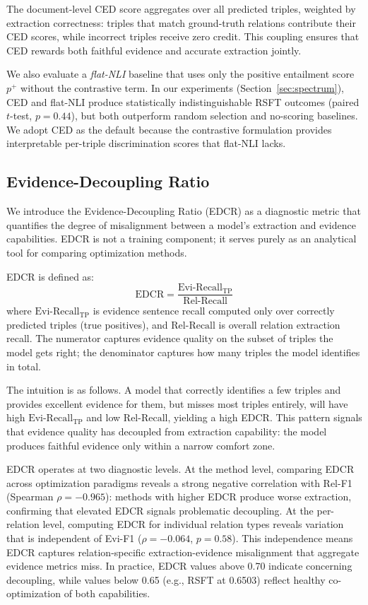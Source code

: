 The document-level CED score aggregates over all predicted triples, weighted by extraction correctness: triples that match ground-truth relations contribute their CED scores, while incorrect triples receive zero credit. This coupling ensures that CED rewards both faithful evidence and accurate extraction jointly.

We also evaluate a \emph{flat-NLI} baseline that uses only the positive entailment score $p^+$ without the contrastive term. In our experiments (Section~\ref{sec:spectrum}), CED and flat-NLI produce statistically indistinguishable RSFT outcomes (paired $t$-test, $p{=}0.44$), but both outperform random selection and no-scoring baselines. We adopt CED as the default because the contrastive formulation provides interpretable per-triple discrimination scores that flat-NLI lacks.


\subsection{Evidence-Decoupling Ratio}
\label{sec:edcr}

We introduce the Evidence-Decoupling Ratio (EDCR) as a diagnostic metric that quantifies the degree of misalignment between a model's extraction and evidence capabilities. EDCR is not a training component; it serves purely as an analytical tool for comparing optimization methods.

EDCR is defined as:
\begin{equation}
\text{EDCR} = \frac{\text{Evi-Recall}_{\text{TP}}}{\text{Rel-Recall}}
\label{eq:edcr}
\end{equation}
where $\text{Evi-Recall}_{\text{TP}}$ is evidence sentence recall computed only over correctly predicted triples (true positives), and $\text{Rel-Recall}$ is overall relation extraction recall. The numerator captures evidence quality on the subset of triples the model gets right; the denominator captures how many triples the model identifies in total.

The intuition is as follows. A model that correctly identifies a few triples and provides excellent evidence for them, but misses most triples entirely, will have high $\text{Evi-Recall}_{\text{TP}}$ and low $\text{Rel-Recall}$, yielding a high EDCR. This pattern signals that evidence quality has decoupled from extraction capability: the model produces faithful evidence only within a narrow comfort zone.

EDCR operates at two diagnostic levels. At the method level, comparing EDCR across optimization paradigms reveals a strong negative correlation with Rel-F1 (Spearman $\rho{=}{-}0.965$): methods with higher EDCR produce worse extraction, confirming that elevated EDCR signals problematic decoupling. At the per-relation level, computing EDCR for individual relation types reveals variation that is independent of Evi-F1 ($\rho{=}{-}0.064$, $p{=}0.58$). This independence means EDCR captures relation-specific extraction-evidence misalignment that aggregate evidence metrics miss. In practice, EDCR values above 0.70 indicate concerning decoupling, while values below 0.65 (e.g., RSFT at 0.6503) reflect healthy co-optimization of both capabilities.
